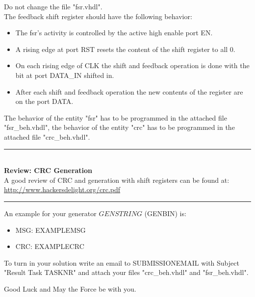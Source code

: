 \documentclass[a4paper,12pt]{article}
\begin{document}
Do not change the file "fsr.vhdl".
\\

The feedback shift register should have the following behavior:
\begin{itemize}
    \item The fsr's activity is controlled by the active high enable port EN.
    \item A rising edge at port RST resets the content of the shift register to all 0.
    \item On each rising edge of CLK the shift and feedback operation is done with the bit at port DATA\_IN shifted in.
    \item After each shift and feedback operation the new contents of the register are on the port DATA.
\end{itemize}
The behavior of the entity "fsr" has to be programmed in the attached file "fsr\_beh.vhdl", the behavior of the entity "crc" has to be programmed in the attached file "crc\_beh.vhdl".
\\
\rule{16cm}{0.4pt}
\\
\textbf{Review: CRC Generation}
\\
A good review of CRC and generation with shift registers can be found at:\\
\url{http://www.hackersdelight.org/crc.pdf}
\\
\rule{16cm}{0.4pt}


An example for your generator ${{GENSTRING}}$ ({{GENBIN}}) is:
\begin{itemize}
    \item MSG: {{EXAMPLEMSG}}
    \item CRC: {{EXAMPLECRC}}
\end{itemize}

\vspace{0.3cm}
To turn in your solution write an email to {{SUBMISSIONEMAIL}} with Subject "Result Task {{TASKNR}}" and attach your files "crc\_beh.vhdl" and "fsr\_beh.vhdl".
\vspace{0.7cm}

Good Luck and May the Force be with you.
\end{document}
